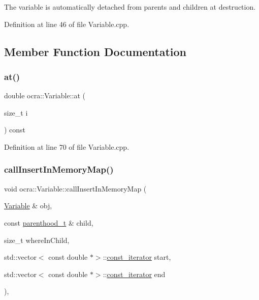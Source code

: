 The variable is automatically detached from parents and children at destruction. 



Definition at line 46 of file Variable.\+cpp.



\subsection{Member Function Documentation}
\hypertarget{classocra_1_1Variable_aa63236c657ccd8a0f347f257be5ba8fc}{}\label{classocra_1_1Variable_aa63236c657ccd8a0f347f257be5ba8fc} 
\subsubsection{\texorpdfstring{at()}{at()}}
{\footnotesize\ttfamily double ocra\+::\+Variable\+::at (\begin{DoxyParamCaption}\item[{size\+\_\+t}]{i }\end{DoxyParamCaption}) const}



Definition at line 70 of file Variable.\+cpp.

\hypertarget{classocra_1_1Variable_a43d6c01f9fe017b4cfb78e4a18104bc8}{}\label{classocra_1_1Variable_a43d6c01f9fe017b4cfb78e4a18104bc8} 
\subsubsection{\texorpdfstring{call\+Insert\+In\+Memory\+Map()}{callInsertInMemoryMap()}}
{\footnotesize\ttfamily void ocra\+::\+Variable\+::call\+Insert\+In\+Memory\+Map (\begin{DoxyParamCaption}\item[{\hyperlink{classocra_1_1Variable}{Variable} \&}]{obj,  }\item[{const \hyperlink{classocra_1_1Variable_a88444b2124cf5aab069f46734822f31f}{parenthood\+\_\+t} \&}]{child,  }\item[{size\+\_\+t}]{where\+In\+Child,  }\item[{std\+::vector$<$ const double $\ast$$>$\+::\hyperlink{classocra_1_1Component_a6271631f04d2911e4369d1288074eebb}{const\+\_\+iterator}}]{start,  }\item[{std\+::vector$<$ const double $\ast$$>$\+::\hyperlink{classocra_1_1Component_a6271631f04d2911e4369d1288074eebb}{const\+\_\+iterator}}]{end }\end{DoxyParamCaption})\hspace{0.3cm}{\ttfamily [static]}, {\ttfamily [protected]}}



